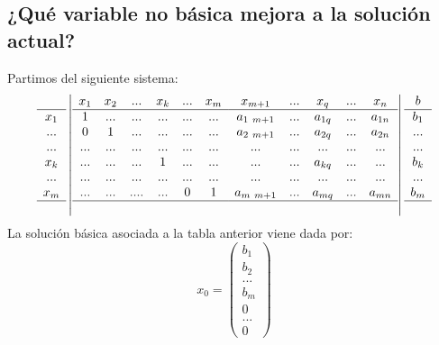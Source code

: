\documentclass[11pt,fleqn]{book} %
\begin{document}
\subsection{¿Qué variable no básica mejora a la solución actual?}
Partimos del siguiente sistema:
$$
\begin{array}{c}
\\ \hline
x_1 \\
... \\
... \\
x_k \\
... \\
x_m \\ \hline
~
\end{array}
\left|
\begin{array}{cccccc}
x_1 & x_2 & ... & x_k & ... & x_m \\ \hline
1 & ... & ... &...& ...& ... \\
0 & 1 & ... & ...& ...& ... \\
... & ... & ... & ... & ...& ... \\
... & ... & ... & 1 & ...& ... \\
... & ... & ... & ... & ...& ... \\
... & ...& .... & ... &  0  & 1\\ \hline
& & & 
\end{array}
\begin{array}{ccccc}
x_{m+1} & ... & x_q & ... & x_n \\ \hline
a_{1 ~ m+1} & ... & a_{1q} & ... & a_{1n} \\
a_{2 ~ m+1} & ... & a_{2q} & ... & a_{2n} \\
... & ... & ... & ...& ... \\
... & ... & a_{kq} & ...& ... \\
... & ... & ... & ...& ... \\
a_{m ~ m+1} & ... & a_{mq} & ... & a_{mn} \\ \hline
& & & &
\end{array}
\right|
\begin{array}{c}
b \\ \hline
b_1 \\
... \\
... \\
b_k \\
... \\
b_m \\ \hline
~
\end{array}
$$
La solución básica asociada a la tabla anterior viene dada por:
$$
x_0=\left(
\begin{array}{c}
b_1 \\
b_2 \\
... \\
b_m \\
0 \\
... \\
0
\end{array}
\right)
$$
\end{document}
